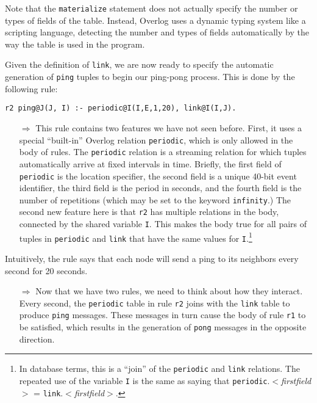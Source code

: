 \documentclass{article}
\begin{document}
Note that the \lstinline$materialize$ statement does not actually
specify the number or types of fields of the table.  Instead, Overlog
uses a dynamic typing system like a scripting language, detecting the number and types of
fields automatically by the way the table is used in the program.

Given the definition of \lstinline$link$, we are now ready to specify
the automatic generation of \lstinline$ping$ tuples to begin our
ping-pong process.  This is done by the following rule:
\begin{lstlisting}
r2 ping@J(J, I) :- periodic@I(I,E,1,20), link@I(I,J).
\end{lstlisting}

\begin{itemize}
\item[$\Longrightarrow$] This rule contains two features we have not
  seen before.  First, it uses a special ``built-in'' Overlog relation
  \lstinline$periodic$, which is only allowed in the body of rules.
  The \lstinline$periodic$ relation is a streaming relation for which
  tuples automatically arrive at fixed intervals in time. Briefly, the
  first field of \lstinline$periodic$ is the location specifier, the
  second field is a unique 40-bit event identifier, the third field is
  the period in seconds, and the fourth field is the number of
  repetitions (which may be set to the keyword \lstinline$infinity$.)
  The second new feature here is that \lstinline$r2$ has multiple
  relations in the body, connected by the shared variable
  \lstinline$I$.  This makes the body true for all pairs of tuples in
  \lstinline$periodic$ and \lstinline$link$ that have the same values
  for \lstinline$I$.\footnote{In database terms, this is a ``join'' of
    the \lstinline$periodic$ and \lstinline$link$ relations.  The
    repeated use of the variable \lstinline$I$ is the same as saying
    that \lstinline$periodic$.$<${\em firstfield}$>$ =
    \lstinline$link$.$<${\em firstfield}$>$.}
\end{itemize}
\noindent
Intuitively, the rule says that each node will send a ping to its
neighbors every second for 20 seconds.

\begin{itemize}
\item[$\Longrightarrow$]  Now that we have two rules, we need to think about how
  they interact.  Every second, the \lstinline$periodic$ table in rule
  \lstinline$r2$ joins with the \lstinline$link$ table to produce
  \lstinline$ping$ messages. These messages in turn cause the body of
  rule \lstinline$r1$ to be satisfied, which results in the generation
  of \lstinline$pong$ messages in the opposite direction.
\end{itemize}
\end{document}
